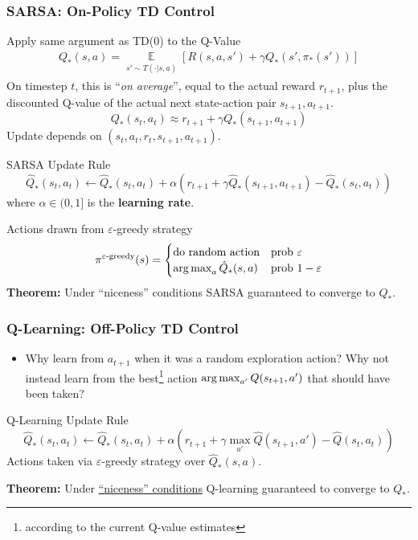 %
\begin{frame}
	\frametitle{SARSA: On-Policy TD Control}
Apply same argument as TD(0) to the Q-Value
\begin{align*}
	Q_*(s,a) = 
	\underset{\substack{s' \sim T(\cdot | s, a)}}{\mathbb{E}} \left[ R(s,a,s') + \gamma Q_*(s', \pi_*(s')) \right]
\end{align*}
\pause
On timestep $t$, this is ``\textit{on average}'', equal to the actual reward $r_{t+1}$, plus the discounted Q-value of the actual next state-action pair $s_{t+1},a_{t+1}$.
$$
Q_{*}(s_t, a_t) \approx r_{t+1} + \gamma Q_{*}(s_{t+1}, a_{t+1})
$$
Update depends on $(s_t, a_t, r_t, s_{t+1}, a_{t+1})$.
\pause
\begin{block}{SARSA Update Rule}
$$
\hat{Q}_*(s_t, a_t) \leftarrow  \hat{Q}_*(s_t, a_t) + \alpha 
\left( r_{t+1} + \gamma \hat{Q}_*(s_{t+1}, a_{t+1}) - \hat{Q}_*(s_t, a_t) \right) 
$$
where $\alpha \in (0,1]$ is the \textbf{learning rate}.
\end{block}
\pause
Actions drawn from $\varepsilon$-greedy strategy 
$$
\pi^{\varepsilon\text{-greedy}}(s) = \begin{cases}
 \text{do random action} & \text{prob } \varepsilon \\
 \operatorname*{arg\,max}_a \hat{Q}_*(s,a) & \text{prob } 1-\varepsilon 
\end{cases}
$$
\pause
\textbf{Theorem:} Under ``niceness'' conditions 
SARSA guaranteed to converge to $Q_*$. 
	
\end{frame}

%
\begin{frame}
\frametitle{Q-Learning: Off-Policy TD Control}
	\begin{itemize}
		\item Why learn from $a_{t+1}$ when it was a random exploration action? 
		Why not instead learn
		from the best\footnote{according to the current Q-value estimates} action $\operatorname*{arg\,max}_{a'} Q(s_{t+1}, a')$ that should have been taken?
	\end{itemize}
	\pause
	
\begin{block}{Q-Learning Update Rule}
$$
\hat{Q}_*(s_t, a_t)  \leftarrow \hat{Q}_*(s_t,a_t)
+ \alpha \left( 
r_{t+1} + \gamma \max_{a'} \hat{Q}(s_{t+1}, a') - \hat{Q}(s_t, a_t)
\right)
$$
Actions taken via $\varepsilon$-greedy strategy over $\hat{Q}_*(s,a)$.
\end{block}
\pause
\textbf{Theorem:} Under \href{https://link.springer.com/article/10.1007/BF00992698}{``niceness'' conditions} 
Q-learning guaranteed to converge to $Q_*$. 
\end{frame}


